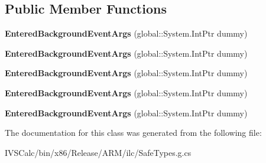 \subsection*{Public Member Functions}
\begin{DoxyCompactItemize}
\item 
\mbox{\label{class_windows_1_1_application_model_1_1_entered_background_event_args_a44add5ce3c8f38f3bb554fcceb069d3f}} 
{\bfseries Entered\+Background\+Event\+Args} (global\+::\+System.\+Int\+Ptr dummy)
\item 
\mbox{\label{class_windows_1_1_application_model_1_1_entered_background_event_args_a44add5ce3c8f38f3bb554fcceb069d3f}} 
{\bfseries Entered\+Background\+Event\+Args} (global\+::\+System.\+Int\+Ptr dummy)
\item 
\mbox{\label{class_windows_1_1_application_model_1_1_entered_background_event_args_a44add5ce3c8f38f3bb554fcceb069d3f}} 
{\bfseries Entered\+Background\+Event\+Args} (global\+::\+System.\+Int\+Ptr dummy)
\item 
\mbox{\label{class_windows_1_1_application_model_1_1_entered_background_event_args_a44add5ce3c8f38f3bb554fcceb069d3f}} 
{\bfseries Entered\+Background\+Event\+Args} (global\+::\+System.\+Int\+Ptr dummy)
\item 
\mbox{\label{class_windows_1_1_application_model_1_1_entered_background_event_args_a44add5ce3c8f38f3bb554fcceb069d3f}} 
{\bfseries Entered\+Background\+Event\+Args} (global\+::\+System.\+Int\+Ptr dummy)
\end{DoxyCompactItemize}


The documentation for this class was generated from the following file\+:\begin{DoxyCompactItemize}
\item 
I\+V\+S\+Calc/bin/x86/\+Release/\+A\+R\+M/ilc/Safe\+Types.\+g.\+cs\end{DoxyCompactItemize}
